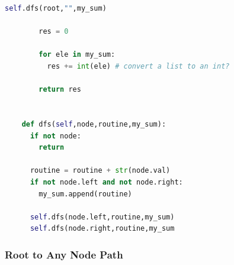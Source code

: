 \documentclass[../main.tex]{subfiles}
\begin{document}
\begin{examples}[resume]
\begin{lstlisting}[language=Python]
        self.dfs(root,"",my_sum)
        
        res = 0
        
        for ele in my_sum:
          res += int(ele) # convert a list to an int?
        
        return res
     
    
    def dfs(self,node,routine,my_sum):
      if not node:
        return 
      
      routine = routine + str(node.val)
      if not node.left and not node.right:
        my_sum.append(routine)
        
      self.dfs(node.left,routine,my_sum)
      self.dfs(node.right,routine,my_sum
\end{lstlisting}
\end{examples}
\subsubsection{Root to Any Node Path}
\end{document}
